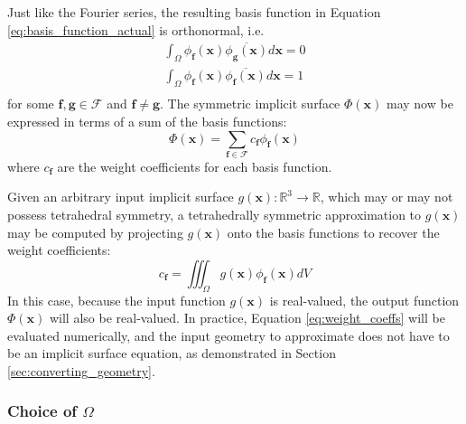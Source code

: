 \documentclass[acmtog]{acmart}
\begin{document}
Just like the Fourier series, the resulting basis function in Equation \ref{eq:basis_function_actual} is orthonormal, i.e.
%
\begin{equation}
  \begin{split}
    \int_{\Omega} \phi_{\mathbf{f}}(\mathbf{x}) \overline{\phi_{\mathbf{g}}(\mathbf{x})} d\mathbf{x} = 0 \\
    \int_{\Omega} \phi_{\mathbf{f}}(\mathbf{x}) \overline{\phi_{\mathbf{f}}(\mathbf{x})} d\mathbf{x} = 1 \\
  \end{split}
\end{equation}
%
for some $\mathbf{f}, \mathbf{g} \in \mathcal{F}$ and $\mathbf{f} \neq \mathbf{g}$. The symmetric implicit surface $\Phi(\mathbf{x})$ may now be expressed in terms of a sum of the basis functions:
%
\begin{equation}
  \label{eq:symmetric_implicit_surface}
  \Phi(\mathbf{x}) = \sum\limits_{\mathbf{f} \in \mathcal{F}} c_{\mathbf{f}} \phi_{\mathbf{f}}(\mathbf{x})
\end{equation}
%
where $c_{\mathbf{f}}$ are the weight coefficients for each basis function.

Given an arbitrary input implicit surface $g(\mathbf{x}): \mathbb{R}^3 \rightarrow \mathbb{R}$, which may or may not possess tetrahedral symmetry, a tetrahedrally symmetric approximation to $g(\mathbf{x})$ may be computed by projecting $g(\mathbf{x})$ onto the basis functions to recover the weight coefficients:
%
\begin{equation}
  \label{eq:weight_coeffs}
  c_{\mathbf{f}} = \iiint_{\Omega} g(\mathbf{x}) \phi_{\mathbf{f}}(\mathbf{x}) dV
\end{equation}
%
In this case, because the input function $g(\mathbf{x})$ is real-valued, the output function $\Phi(\mathbf{x})$ will also be real-valued. In practice, Equation \ref{eq:weight_coeffs} will be evaluated numerically, and the input geometry to approximate does not have to be an implicit surface equation, as demonstrated in Section \ref{sec:converting_geometry}.

\subsubsection{Choice of $\Omega$}
\end{document}
